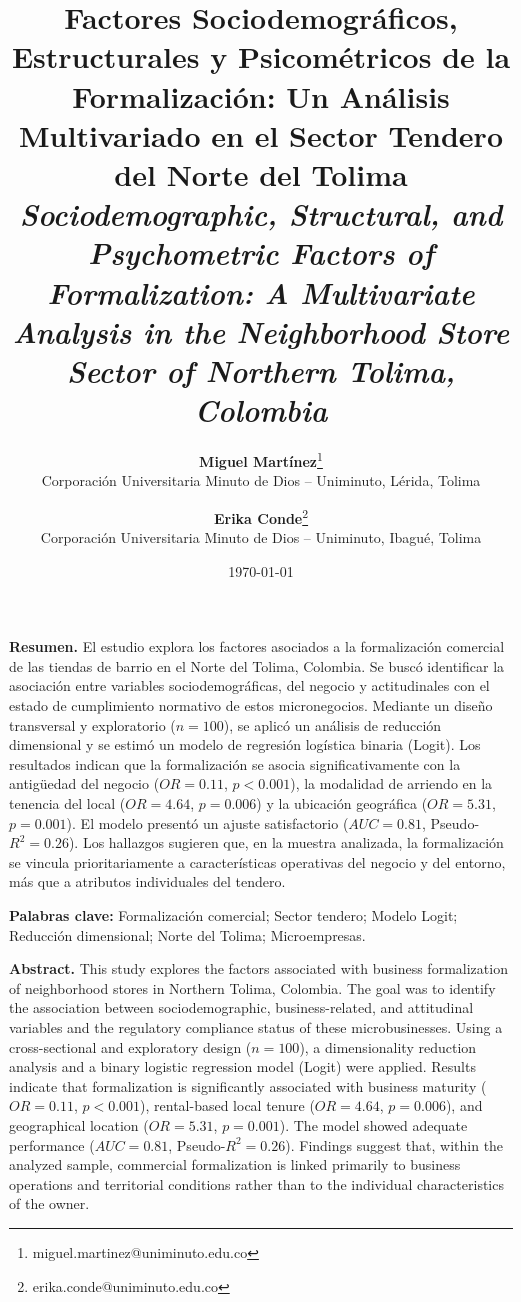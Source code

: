 \documentclass[11pt,a4paper]{article}
\title{\vspace{-2cm}\huge \textbf{Factores Sociodemogr\'aficos, Estructurales y Psicom\'etricos de la Formalizaci\'on: Un An\'alisis Multivariado en el Sector Tendero del Norte del Tolima}\\[0.6em]
\large \textit{Sociodemographic, Structural, and Psychometric Factors of Formalization: A Multivariate Analysis in the Neighborhood Store Sector of Northern Tolima, Colombia}}
\author{
    \textbf{Miguel Mart\'inez}\thanks{miguel.martinez@uniminuto.edu.co} \\
    \small Corporaci\'on Universitaria Minuto de Dios -- Uniminuto, L\'erida, Tolima
    \and
    \textbf{Erika Conde}\thanks{erika.conde@uniminuto.edu.co} \\
    \small Corporaci\'on Universitaria Minuto de Dios -- Uniminuto, Ibagu\'e, Tolima
}
\date{\small \today}
\begin{document}
\maketitle

\vspace{1em}
\noindent\textbf{Resumen.} El estudio explora los factores asociados a la formalización comercial de las tiendas de barrio en el Norte del Tolima, Colombia. Se buscó identificar la asociación entre variables sociodemográficas, del negocio y actitudinales con el estado de cumplimiento normativo de estos micronegocios. Mediante un diseño transversal y exploratorio ($n=100$), se aplicó un análisis de reducción dimensional y se estimó un modelo de regresión logística binaria (Logit). Los resultados indican que la formalización se asocia significativamente con la antigüedad del negocio ($OR=0.11$, $p<0.001$), la modalidad de arriendo en la tenencia del local ($OR=4.64$, $p=0.006$) y la ubicación geográfica ($OR=5.31$, $p=0.001$). El modelo presentó un ajuste satisfactorio ($AUC=0.81$, Pseudo-$R^2=0.26$). Los hallazgos sugieren que, en la muestra analizada, la formalización se vincula prioritariamente a características operativas del negocio y del entorno, más que a atributos individuales del tendero.

\vspace{0.5em}
\noindent\textbf{Palabras clave:} Formalizaci\'on comercial; Sector tendero; Modelo Logit; Reducci\'on dimensional; Norte del Tolima; Microempresas.

\vspace{1.5em}

\noindent\textbf{Abstract.} This study explores the factors associated with business formalization of neighborhood stores in Northern Tolima, Colombia. The goal was to identify the association between sociodemographic, business-related, and attitudinal variables and the regulatory compliance status of these microbusinesses. Using a cross-sectional and exploratory design ($n=100$), a dimensionality reduction analysis and a binary logistic regression model (Logit) were applied. Results indicate that formalization is significantly associated with business maturity ($OR=0.11$, $p<0.001$), rental-based local tenure ($OR=4.64$, $p=0.006$), and geographical location ($OR=5.31$, $p=0.001$). The model showed adequate performance ($AUC=0.81$, Pseudo-$R^2=0.26$). Findings suggest that, within the analyzed sample, commercial formalization is linked primarily to business operations and territorial conditions rather than to the individual characteristics of the owner.
\end{document}
